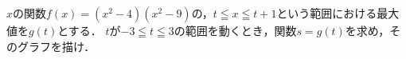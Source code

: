 \documentclass[../../main.tex]{subfiles}
\begin{document}
$x$の関数$f(x)=(x^2-4)(x^2-9)$の，$t \leqq x \leqq t+1$という範囲における最大値を$g(t)$とする．
$t$が$-3 \leqq t \leqq 3$の範囲を動くとき，関数$s=g(t)$を求め，そのグラフを描け．
\end{document}

